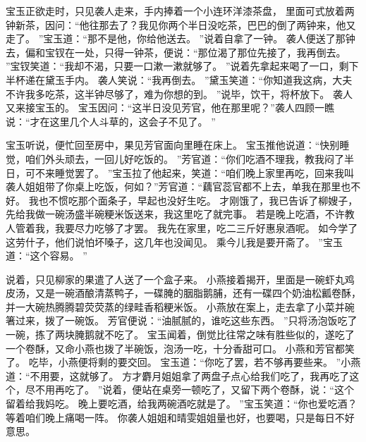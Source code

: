 \par
宝玉正欲走时，只见袭人走来，手内捧着一个小连环洋漆茶盘，
里面可式放着两钟新茶，因问：“他往那去了？我见你两个半日没吃茶，巴巴的倒了两钟来，他又走了。
”宝玉道：“那不是他，你给他送去。
”说着自拿了一钟。
袭人便送了那钟去，偏和宝钗在一处，只得一钟茶，便说：“那位渴了那位先接了，我再倒去。
”宝钗笑道：“我却不渴，只要一口漱一漱就够了。
”说着先拿起来喝了一口，剩下半杯递在黛玉手内。
袭人笑说：“我再倒去。
”黛玉笑道：“你知道我这病，大夫不许我多吃茶，这半钟尽够了，难为你想的到。
”说毕，饮干，将杯放下。
袭人又来接宝玉的。
宝玉因问：“这半日没见芳官，他在那里呢？”袭人四顾一瞧说：“才在这里几个人斗草的，这会子不见了。
”\par
宝玉听说，便忙回至房中，果见芳官面向里睡在床上。
宝玉推他说道：“快别睡觉，咱们外头顽去，一回儿好吃饭的。
”芳官道：“你们吃酒不理我，教我闷了半日，可不来睡觉罢了。
”宝玉拉了他起来，笑道：“咱们晚上家里再吃，回来我叫袭人姐姐带了你桌上吃饭，何如？”芳官道：“藕官蕊官都不上去，单我在那里也不好。
我也不惯吃那个面条子，早起也没好生吃。
才刚饿了，我已告诉了柳嫂子，先给我做一碗汤盛半碗粳米饭送来，我这里吃了就完事。
若是晚上吃酒，不许教人管着我，我要尽力吃够了才罢。
我先在家里，吃二三斤好惠泉酒呢。
如今学了这劳什子，他们说怕坏嗓子，这几年也没闻见。
乘今儿我是要开斋了。
”宝玉道：“这个容易。
”\par
说着，只见柳家的果遣了人送了一个盒子来。
小燕接着揭开，里面是一碗虾丸鸡皮汤，又是一碗酒酿清蒸鸭子，一碟腌的胭脂鹅脯，还有一碟四个奶油松瓤卷酥，并一大碗热腾腾碧荧荧蒸的绿畦香稻粳米饭。
小燕放在案上，走去拿了小菜并碗箸过来，拨了一碗饭。
芳官便说：“油腻腻的，谁吃这些东西。
”只将汤泡饭吃了一碗，拣了两块腌鹅就不吃了。
宝玉闻着，倒觉比往常之味有胜些似的，遂吃了一个卷酥，又命小燕也拨了半碗饭，泡汤一吃，十分香甜可口。
小燕和芳官都笑了。
吃毕，小燕便将剩的要交回。
宝玉道：“你吃了罢，若不够再要些来。
”小燕道：“不用要，这就够了。
方才麝月姐姐拿了两盘子点心给我们吃了，我再吃了这个，尽不用再吃了。
”说着，便站在桌旁一顿吃了，又留下两个卷酥，说：“这个留着给我妈吃。
晚上要吃酒，给我两碗酒吃就是了。
”宝玉笑道：“你也爱吃酒？等着咱们晚上痛喝一阵。
你袭人姐姐和晴雯姐姐量也好，也要喝，只是每日不好意思。
